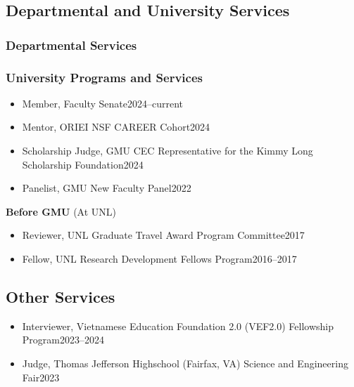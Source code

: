 \documentclass[11pt]{article}
\newcommand{\beforegmu}{\textbf{Before GMU}}
\begin{document}
\subsection{Departmental and University Services}
\subsubsection{Departmental Services}

\myunitservices{}


\subsubsection{University Programs and Services}
\begin{itemize}
    \item Member, Faculty Senate\hfill 2024--current
    \item Mentor, ORIEI NSF CAREER Cohort\hfill 2024
    \item Scholarship Judge, GMU CEC Representative for the Kimmy Long Scholarship Foundation\hfill 2024
    \item Panelist, GMU New Faculty Panel\hfill 2022
\end{itemize}
\vspace{0.1in}
\beforegmu{} (At UNL)
\vspace{0.1in}
\begin{itemize}
    \item Reviewer,  UNL Graduate Travel Award Program Committee\hfill 2017
    \item Fellow, UNL Research Development Fellows Program\hfill 2016--2017
\end{itemize}


\subsection{Other Services}
\begin{itemize}
    \item  Interviewer, Vietnamese Education Foundation 2.0 (VEF2.0) Fellowship Program\hfill 2023--2024
    \item Judge, Thomas Jefferson Highschool (Fairfax, VA) Science and Engineering Fair\hfill 2023
\end{itemize}
\end{document}
